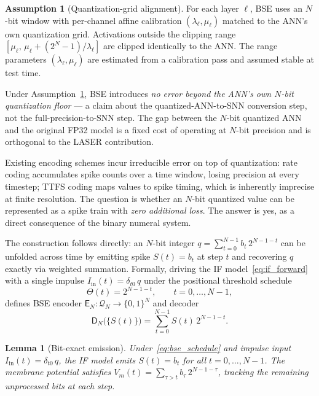 \documentclass{article}
\theoremstyle{plain}
\newtheorem{lemma}[theorem]{Lemma}
\theoremstyle{definition}
\newtheorem{assumption}[theorem]{Assumption}
\theoremstyle{remark}
\begin{document}
\begin{assumption}[Quantization-grid alignment]
\label{asm:quantization_alignment}
For each layer $\ell$, BSE uses an $N$-bit window with per-channel affine
calibration $(\lambda_\ell, \mu_\ell)$ matched to the ANN's own quantization
grid. Activations outside the clipping range
$[\mu_\ell,\, \mu_\ell + (2^N-1)/\lambda_\ell]$ are clipped identically to the ANN.
The range parameters $(\lambda_\ell, \mu_\ell)$ are estimated from a calibration pass
and assumed stable at test time.
\end{assumption}

Under Assumption~\ref{asm:quantization_alignment}, BSE introduces \emph{no error beyond the ANN's own $N$-bit quantization floor} — a claim about the quantized-ANN-to-SNN conversion step, not the full-precision-to-SNN step. The gap between the $N$-bit quantized ANN and the original FP32 model is a fixed cost of operating at $N$-bit precision and is orthogonal to the LASER contribution.

Existing encoding schemes incur irreducible error on top of quantization: rate coding accumulates spike counts over a time window, losing precision at every timestep; TTFS coding maps values to spike timing, which is inherently imprecise at finite resolution. The question is whether an $N$-bit quantized value can be represented as a spike train with \emph{zero additional loss}. The answer is yes, as a direct consequence of the binary numeral system.

The construction follows directly: an $N$-bit integer $q = \sum_{t=0}^{N-1} b_t\,2^{N-1-t}$ can be unfolded across time by emitting spike $S(t) = b_t$ at step $t$ and recovering $q$ exactly via weighted summation. Formally, driving the IF model~\eqref{eq:if_forward} with a single impulse $I_{\mathrm{in}}(t) = \delta_{t0}\,q$ under the positional threshold schedule
\begin{equation}
\label{eq:bse_schedule}
\Theta(t) = 2^{N-1-t}, \qquad t = 0, \dots, N-1,
\end{equation}
defines BSE encoder $\mathsf{E}_N : \mathcal{Q}_N \to \{0,1\}^N$ and decoder
\begin{equation}
\label{eq:bse_decoder}
\mathsf{D}_N\!\big(\{S(t)\}\big) = \sum_{t=0}^{N-1} S(t)\,2^{N-1-t}.
\end{equation}

\begin{lemma}[Bit-exact emission]
\label{lem:bit_exact_main}
Under~\eqref{eq:bse_schedule} and impulse input $I_{\mathrm{in}}(t) = \delta_{t0}\,q$, the IF model emits $S(t) = b_t$ for all $t = 0, \dots, N-1$. The membrane potential satisfies $V_m(t) = \sum_{\tau > t} b_\tau\,2^{N-1-\tau}$, tracking the remaining unprocessed bits at each step.
\end{lemma}
\end{document}

